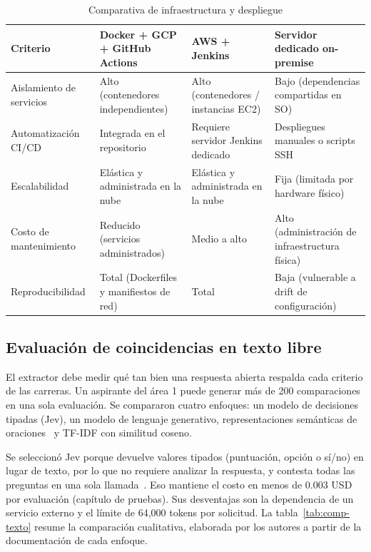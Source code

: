 \begin{table}[htbp]
\centering
\small
\renewcommand{\arraystretch}{1.2}
\caption{Comparativa de infraestructura y despliegue}
\label{tab:comp-infra}
\begin{tabularx}{\textwidth}{L{0.22\textwidth}XXX}
\toprule
{} \color{white}\textbf{Criterio} & \color{white}\textbf{Docker + GCP + GitHub Actions} & \color{white}\textbf{AWS + Jenkins} & \color{white}\textbf{Servidor dedicado on-premise} \\
\midrule
Aislamiento de servicios & Alto (contenedores independientes) & Alto (contenedores / instancias EC2) & Bajo (dependencias compartidas en SO) \\
Automatización CI/CD & Integrada en el repositorio & Requiere servidor Jenkins dedicado & Despliegues manuales o scripts SSH \\
Escalabilidad & Elástica y administrada en la nube & Elástica y administrada en la nube & Fija (limitada por hardware físico) \\
Costo de mantenimiento & Reducido (servicios administrados) & Medio a alto & Alto (administración de infraestructura física) \\
Reproducibilidad & Total (Dockerfiles y manifiestos de red) & Total & Baja (vulnerable a drift de configuración) \\
\bottomrule
\end{tabularx}
\end{table}

\subsection{Evaluación de coincidencias en texto libre}
El extractor debe medir qué tan bien una respuesta abierta respalda cada criterio de las carreras. Un aspirante del área 1 puede generar más de 200 comparaciones en una sola evaluación. Se compararon cuatro enfoques: un modelo de decisiones tipadas (Jev), un modelo de lenguaje generativo, representaciones semánticas de oraciones~\cite{Reimers2019SBERT} y TF-IDF con similitud coseno.

Se seleccionó Jev porque devuelve valores tipados (puntuación, opción o sí/no) en lugar de texto, por lo que no requiere analizar la respuesta, y contesta todas las preguntas en una sola llamada~\cite{JevAPI2026}. Eso mantiene el costo en menos de 0.003 USD por evaluación (capítulo de pruebas). Sus desventajas son la dependencia de un servicio externo y el límite de 64,000 tokens por solicitud. La tabla~\ref{tab:comp-texto} resume la comparación cualitativa, elaborada por los autores a partir de la documentación de cada enfoque.

